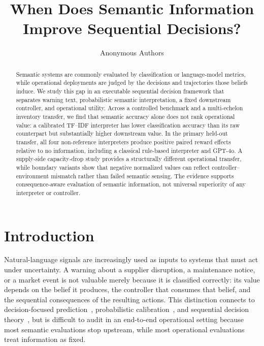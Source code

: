 \documentclass[10pt]{article}
\title{When Does Semantic Information Improve Sequential Decisions?}
\author{Anonymous Authors}
\begin{document}
\maketitle

\begin{abstract}
Semantic systems are commonly evaluated by classification or language-model metrics, while operational deployments are judged by the decisions and trajectories those beliefs induce. We study this gap in an executable sequential decision framework that separates warning text, probabilistic semantic interpretation, a fixed downstream controller, and operational utility. Across a controlled benchmark and a multi-echelon inventory transfer, we find that semantic accuracy alone does not rank operational value: a calibrated TF--IDF interpreter has lower classification accuracy than its raw counterpart but substantially higher downstream value. In the primary held-out transfer, all four non-reference interpreters produce positive paired reward effects relative to no information, including a classical rule-based interpreter and GPT-4o. A supply-side capacity-drop study provides a structurally different operational transfer, while boundary variants show that negative normalized values can reflect controller--environment mismatch rather than failed semantic sensing. The evidence supports consequence-aware evaluation of semantic information, not universal superiority of any interpreter or controller.
\end{abstract}

\section{Introduction}

Natural-language signals are increasingly used as inputs to systems that must act under uncertainty. A warning about a supplier disruption, a maintenance notice, or a market event is not valuable merely because it is classified correctly: its value depends on the belief it produces, the controller that consumes that belief, and the sequential consequences of the resulting actions. This distinction connects to decision-focused prediction~\citep{donti2017task,elmachtoub2022smart}, probabilistic calibration~\citep{guo2017calibration,degroot1983comparison}, and sequential decision theory~\citep{puterman1994markov}, but is difficult to audit in an end-to-end operational setting because most semantic evaluations stop upstream, while most operational evaluations treat information as fixed.
\end{document}
